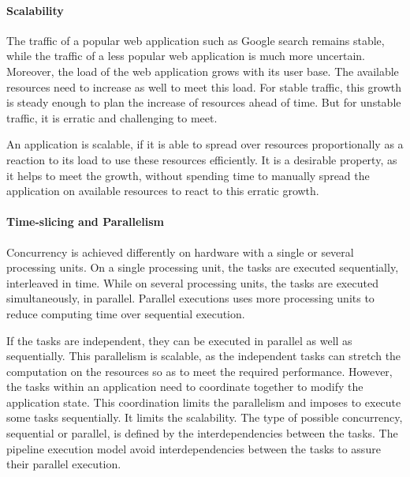 \paragraph{Scalability}

The traffic of a popular web application such as Google search remains stable, while the traffic of a less popular web application is much more uncertain.
Moreover, the load of the web application grows with its user base.
The available resources need to increase as well to meet this load.
For stable traffic, this growth is steady enough to plan the increase of resources ahead of time.
But for unstable traffic, it is erratic and challenging to meet.

An application is scalable, if it is able to spread over resources proportionally as a reaction to its load to use these resources efficiently.
It is a desirable property, as it helps to meet the growth, without spending time to manually spread the application on available resources to react to this erratic growth.

\paragraph{Time-slicing and Parallelism}

Concurrency is achieved differently on hardware with a single or several processing units.
On a single processing unit, the tasks are executed sequentially, interleaved in time.
While on several processing units, the tasks are executed simultaneously, in parallel.
Parallel executions uses more processing units to reduce computing time over sequential execution.

If the tasks are independent, they can be executed in parallel as well as sequentially.
This parallelism is scalable, as the independent tasks can stretch the computation on the resources so as to meet the required performance.
However, the tasks within an application need to coordinate together to modify the application state.
This coordination limits the parallelism and imposes to execute some tasks sequentially.
It limits the scalability.
The type of possible concurrency, sequential or parallel, is defined by the interdependencies between the tasks.
The pipeline execution model avoid interdependencies between the tasks to assure their parallel execution.


